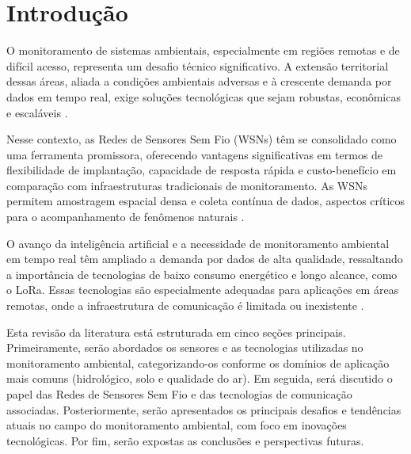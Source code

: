 \chapter{Introdução} \label{cap:intro}

O monitoramento de sistemas ambientais, especialmente em regiões remotas e de difícil acesso, representa um desafio técnico significativo. A extensão territorial dessas áreas, aliada a condições ambientais adversas e à crescente demanda por dados em tempo real, exige soluções tecnológicas que sejam robustas, econômicas e escaláveis \cite{chen_2013_natural}.

Nesse contexto, as Redes de Sensores Sem Fio (WSNs) têm se consolidado como uma ferramenta promissora, oferecendo vantagens significativas em termos de flexibilidade de implantação, capacidade de resposta rápida e custo-benefício em comparação com infraestruturas tradicionais de monitoramento. As WSNs permitem amostragem espacial densa e coleta contínua de dados, aspectos críticos para o acompanhamento de fenômenos naturais \cite{chen_2013_natural, ferreira_2023_conception, pule_2017_wireless}.

O avanço da inteligência artificial e a necessidade de monitoramento ambiental em tempo real têm ampliado a demanda por dados de alta qualidade, ressaltando a importância de tecnologias de baixo consumo energético e longo alcance, como o LoRa. Essas tecnologias são especialmente adequadas para aplicações em áreas remotas, onde a infraestrutura de comunicação é limitada ou inexistente \cite{pule_2017_wireless, chen_2013_natural, ferreira_2023_conception}.

Esta revisão da literatura está estruturada em cinco seções principais. Primeiramente, serão abordados os sensores e as tecnologias utilizadas no monitoramento ambiental, categorizando-os conforme os domínios de aplicação mais comuns (hidrológico, solo e qualidade do ar). Em seguida, será discutido o papel das Redes de Sensores Sem Fio e das tecnologias de comunicação associadas. Posteriormente, serão apresentados os principais desafios e tendências atuais no campo do monitoramento ambiental, com foco em inovações tecnológicas. Por fim, serão expostas as conclusões e perspectivas futuras.

